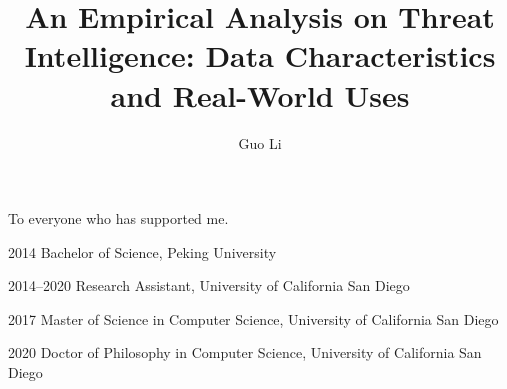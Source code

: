 \documentclass[12pt]{ucsddissertation}
\title{An Empirical Analysis on Threat Intelligence: Data Characteristics and Real-World Uses}
\author{Guo Li}
\begin{document}
\frontmatter
\maketitle
\makecopyright
\makesignature


\begin{dedication}
\setsinglespacing
\raggedright %
\parindent0pt\parskip\baselineskip
\centering
To everyone who has supported me.
\end{dedication}





\tableofcontents
\listoffigures
\listoftables







\begin{vita}
\noindent
\begin{cv}{}
\begin{cvlist}{}
\item[2014] Bachelor of Science, Peking University
\item[2014--2020] Research Assistant, University of California San Diego
\item[2017] Master of Science in Computer Science, University of California San Diego
\item[2020] Doctor of Philosophy in Computer Science, University of California San Diego
\end{cvlist}
\end{cv}
\end{vita}
\end{document}
